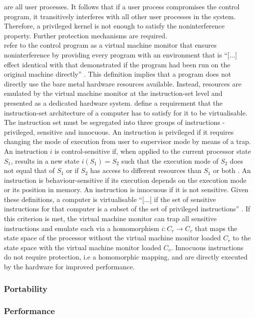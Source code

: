 are all user processes. It follows that if a user process compromises the control 
program, it transitively interferes with all other user processes in the system. 
Therefore, a privileged kernel is not enough to satisfy the noninterference property.
Further protection mechanisms are required.\\
\textcite{10.1145/361011.361073} refer to the control program as a virtual machine monitor that 
ensures noninterference by providing every program with an environment that is \enquote{[...] effect
identical with that demonstrated if the program had been run on the original machine directly} 
\cite[2]{10.1145/361011.361073}. 
This definition implies that a program does not directly use the bare metal hardware resources 
available. Instead, resources are emulated by the virtual machine monitor at the instruction-set level 
and presented as a dedicated hardware system. 
\textcite{10.1145/361011.361073} define a requirement that the instruction-set architecture 
of a computer has to satisfy for it to be virtualisable. 
The instruction set must be segregated into three groups of instructions - privileged, sensitive 
and innocuous. An instruction is privileged if it requires changing the mode of execution from user 
to supervisor mode by means of a trap.
An instruction $i$ is control-sensitive if, when applied to the current processor state $S_1$, 
results in a new state $i(S_{1}) = S_{2}$ such that the execution mode of $S_{2}$ does not equal 
that of $S_{1}$ or if $S_{2}$ has access to different resources than $S_1$ or both 
\cite{10.1145/361011.361073}. An instruction is behaviour-sensitive if its execution depends on the 
execution mode or its position in memory. An instruction is innocuous if it is not sensitive. 
Given these definitions, a computer is virtualisable \enquote{[...] if the set of sensitive instructions
for that computer is a subset of the set of privileged instructions} \cite[6]{10.1145/361011.361073}.
If this criterion is met, the virtual machine monitor can trap all sensitive instructions and 
emulate each via a homomorphism $i: C_{r} \rightarrow C_{v}$ that maps the state space of the 
processor without the virtual machine monitor loaded $C_{r}$ to the state space with the 
virtual machine monitor loaded $C_{v}$. 
Innocuous instructions do not require protection, i.e a homomorphic mapping, and are 
directly executed by the hardware for improved performance. 

\subsubsection{Portability}
\subsubsection{Performance}